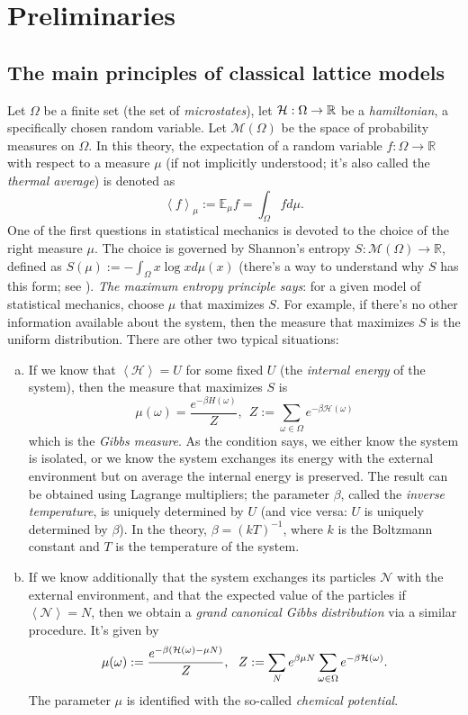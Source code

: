 \section{Preliminaries}
\subsection{The main principles of classical lattice models}
Let $\Omega$ be a finite set (the set of \emph{microstates}), let $\mathcal{H} : \Omega \rightarrow \mathbb R$ be a \emph{hamiltonian}, a specifically chosen random variable. Let $\mathcal M(\Omega)$ be the space of probability measures on $\Omega$. In this theory, the expectation of a random variable $f : \Omega \rightarrow \mathbb R$ with respect to a measure $\mu$ (if not implicitly understood; it's also called the \emph{thermal average}) is denoted as
\[
\left\langle f \right\rangle_{\mu} := \mathbb E_{\mu} f = \int_{\Omega} f d\mu.
\]
One of the first questions in statistical mechanics is devoted to the choice of the right measure $\mu$. The choice is governed by Shannon's entropy $S : \mathcal M(\Omega) \rightarrow \mathbb R$, defined as $S(\mu) := -\int_{\Omega}x\log x d\mu(x)$ (there's a way to understand why $S$ has this form; see \cite{friedli}). \emph{The maximum entropy principle says}: for a given model of statistical mechanics, choose $\mu$ that maximizes $S$. For example, if there's no other information available about the system, then the measure that maximizes $S$ is the uniform distribution. There are other two typical situations:
\begin{enumerate}[(a)]
\item If we know that $\left\langle \mathcal H\right\rangle = U$ for some fixed $U$ (the \emph{internal energy} of the system), then the measure that maximizes $S$ is 
\[
\mu(\omega) = \frac{e^{-\beta H(\omega)}}{Z}, \ \ Z:= \sum_{\omega \in \Omega} e^{-\beta \mathcal H(\omega)} 
\]
which is the \emph{Gibbs measure}. As the condition says, we either know the system is isolated, or we know the system exchanges its energy with the external environment but on average the internal energy is preserved. The result can be obtained using Lagrange multipliers; the parameter $\beta$, called the \emph{inverse temperature}, is uniquely determined by $U$ (and vice versa: $U$ is uniquely determined by $\beta$). In the theory, $\beta = (kT)^{-1}$, where $k$ is the Boltzmann constant and $T$ is the temperature of the system.
\item If we know additionally that the system exchanges its particles $\mathcal N$ with the external environment, and that the expected value of the particles if $\left\langle \mathcal N \right\rangle = N$, then we obtain a \emph{grand canonical Gibbs distribution} via a similar procedure. It's given by
\[
\mu(\omega) := \frac{e^{-\beta(\mathcal{H}(\omega)-\mu N)}}{Z}, \ \ Z := \sum_{N} e^{\beta \mu N} \sum_{\omega \in \Omega} e^{-\beta \mathcal{H} (\omega)}.
\]
The parameter $\mu$ is identified with the so-called \emph{chemical potential}.
\end{enumerate}

